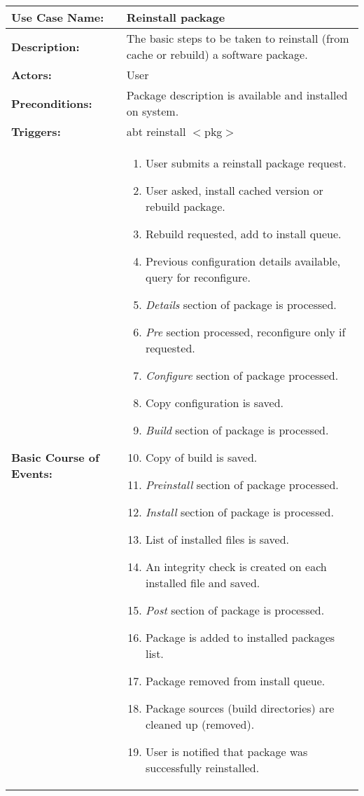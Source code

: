 \begin{tabularx}{\linewidth}{|l|X|}
\hline
\textbf{Use Case Name:} & \textbf{Reinstall package} \\
\hline
\textbf{Description:} & 
The basic steps to be taken to reinstall (from cache or rebuild) a software package.\\
\hline
\textbf{Actors:} & User \\
\hline
\textbf{Preconditions:} & Package description is available and installed on system. \\
\hline
\textbf{Triggers:} & abt reinstall $<$pkg$>$ \\
\hline
\textbf{Basic Course of Events:} & 
\begin{minipage}{\linewidth} 
  \vspace{0.02em}
  \begin{enumerate}
    \item User submits a reinstall package request.
    \item User asked, install cached version or rebuild package.
    \item Rebuild requested, add to install queue.
    \item Previous configuration details available, query for reconfigure.
    \item \emph{Details} section of package is processed.
    \item \emph{Pre} section processed, reconfigure only if requested.
    \item \emph{Configure} section of package processed.
    \item Copy configuration is saved.
    \item \emph{Build} section of package is processed.
    \item Copy of build is saved.
    \item \emph{Preinstall} section of package processed.
    \item \emph{Install} section of package is processed.
    \item List of installed files is saved.
    \item An integrity check is created on each installed file and saved.
    \item \emph{Post} section of package is processed.
    \item Package is added to installed packages list.
    \item Package removed from install queue.
    \item Package sources (build directories) are cleaned up (removed).
    \item User is notified that package was successfully reinstalled.
  \end{enumerate}
  \vspace{0.02em}
\end{minipage}
\\
\hline
\end{tabularx}


